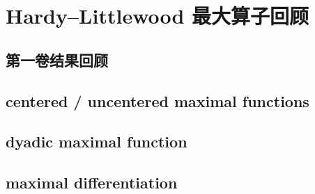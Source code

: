 \section{Hardy–Littlewood 最大算子回顾}
\label{b2:sec:1701}


\subsection{第一卷结果回顾}
\label{b2:subsec:170101}

\subsection{centered / uncentered maximal functions}
\label{b2:subsec:170102}

\subsection{dyadic maximal function}
\label{b2:subsec:170103}

\subsection{maximal differentiation}
\label{b2:subsec:170104}


